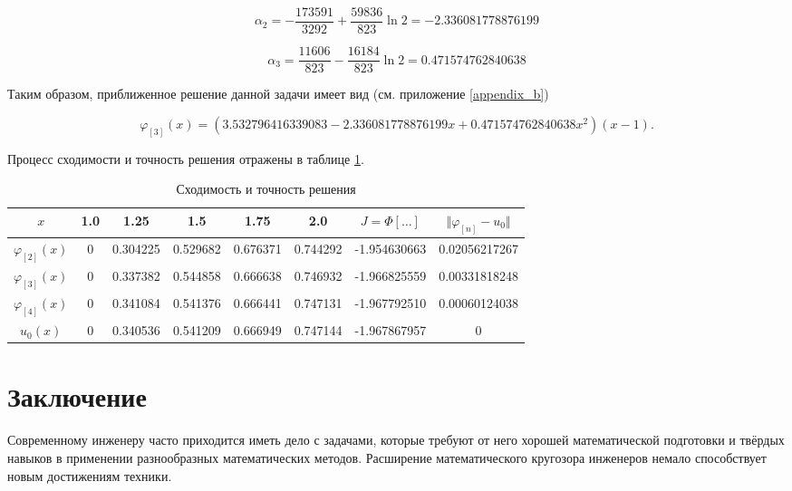 \documentclass{article}
\begin{document}
\begin{displaymath}
	\alpha_{2} = -\frac{173591}{3292} + \frac{59836}{823}\ln{2} = -2.336081778876199
\end{displaymath}

\begin{displaymath}
	\alpha_{3} = \frac{11606}{823} - \frac{16184}{823}\ln{2} = 0.471574762840638
\end{displaymath}

\noindent Таким образом, приближенное решение данной задачи имеет вид (см. приложение \ref{appendix_b})

\begin{displaymath}
	\varphi_{[3]}(x) = (3.532796416339083 - 2.336081778876199x + 0.471574762840638 x^2)(x-1).
\end{displaymath}

Процесс сходимости и точность решения отражены в таблице \ref{table_process_of_convergence_rank_3}.

\begin{table}[!h]
\centering
\begin{tabular}{|c|c|c|c|c|c|c|c|}
	\hline
	$x$ & 1.0 & 1.25 & 1.5 & 1.75 & 2.0 & $J = \Phi[\ldots]$ & $\Vert \varphi_{[n]} - u_{0} \Vert$ \\
	\hline \hline

	$\varphi_{[2]}(x)$ & 0 & 0.304225 & 0.529682 & 0.676371 & 0.744292 & -1.954630663 & 0.02056217267 \\	\hline
	$\varphi_{[3]}(x)$ & 0 & 0.337382 & 0.544858 & 0.666638 & 0.746932 & -1.966825559 & 0.00331818248 \\	\hline
	$\varphi_{[4]}(x)$ & 
0 & 0.341084 & 0.541376 & 0.666441 & 0.747131 & -1.967792510 & 0.00060124038 \\	\hline
	$u_{0}(x)$ & 0 & 0.340536 & 0.541209 & 0.666949 & 0.747144 & -1.967867957 & 0 \\	\hline

\end{tabular}
\caption{Сходимость и точность решения}
\label{table_process_of_convergence_rank_3}
\end{table}


\section*{Заключение}

Современному инженеру часто приходится иметь дело с задачами, которые требуют от него хорошей математической подготовки и твёрдых навыков в применении разнообразных математических методов. Расширение математического кругозора инженеров немало способствует новым достижениям техники.
\end{document}
